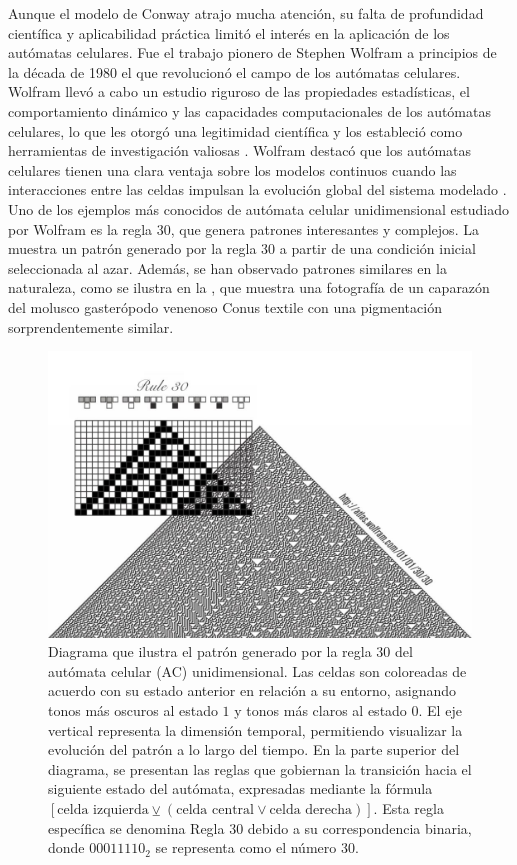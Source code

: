 Aunque el modelo de Conway atrajo mucha atención, su falta de profundidad científica y aplicabilidad práctica limitó el interés en la aplicación de los autómatas celulares. Fue el trabajo pionero de Stephen Wolfram a principios de la década de 1980 el que revolucionó el campo de los autómatas celulares. Wolfram llevó a cabo un estudio riguroso de las propiedades estadísticas, el comportamiento dinámico y las capacidades computacionales de los autómatas celulares, lo que les otorgó una legitimidad científica y los estableció como herramientas de investigación valiosas \cite{wolfram_cellular_2002}. Wolfram destacó que los autómatas celulares tienen una clara ventaja sobre los modelos continuos cuando las interacciones entre las celdas impulsan la evolución global del sistema modelado \cite{lehotzky_cellular_2019}. Uno de los ejemplos más conocidos de autómata celular unidimensional estudiado por Wolfram es la regla $30$, que genera patrones interesantes y complejos. La  muestra un patrón generado por la regla 30 a partir de una condición inicial seleccionada al azar. Además, se han observado patrones similares en la naturaleza, como se ilustra en la , que muestra una fotografía de un caparazón del molusco gasterópodo venenoso Conus textile con una pigmentación sorprendentemente similar.


  
\begin{figure}[ht]
	\centering\includegraphics[width=\imsize]{regla30.jpg}
	\caption[ Diagrama que ilustra el patrón generado por la regla 30 del autómata celular (AC) unidimensional.]{  Diagrama que ilustra el patrón generado por la regla 30 del autómata celular (AC)  unidimensional.  Las celdas son coloreadas de acuerdo con su estado anterior en relación a su entorno, asignando tonos más oscuros al estado $1$ y tonos más claros al estado $0$. El eje vertical representa la dimensión temporal, permitiendo visualizar la evolución del patrón a lo largo del tiempo. En la parte superior del diagrama, se presentan las reglas que gobiernan la transición hacia el siguiente estado del autómata, expresadas mediante la fórmula $[\text{celda izquierda} \veebar (\text{celda central} \lor \text{celda derecha})]$. Esta regla específica se denomina Regla $30$ debido a su correspondencia binaria, donde ${00011110}_2$ se representa como el número 30.} \label{fig:regla30}
\end{figure}

